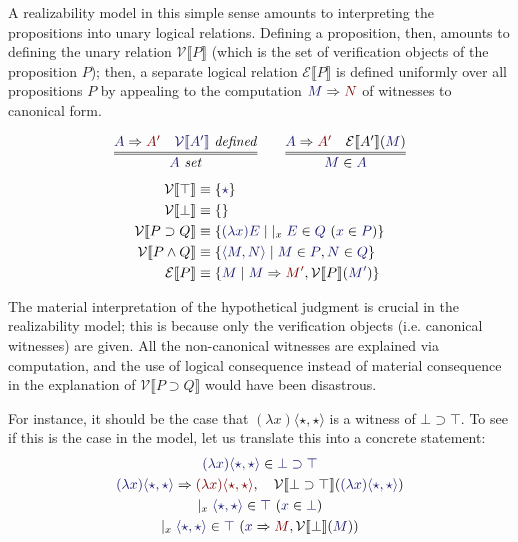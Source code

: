 \documentclass[11pt]{amsart}
\theoremstyle{definition}
\theoremstyle{remark}
\numberwithin{equation}{section}
\def\InputModeColorName{MidnightBlue}
\def\OutputModeColorName{Maroon}
\newcommand\InputMode[1]{{\color{\InputModeColorName}{#1}}}
\newcommand\OutputMode[1]{{\color{\OutputModeColorName}{#1}}}
\newcommand\HypJ[2]{#1\ (#2)}
\newcommand\GenJ[2]{\vert_{#1}\; #2}
\newcommand\IsSet[1]{\InputMode{#1}\ \mathit{set}}
\newcommand\Member[2]{\InputMode{#1}\in \InputMode{#2}}
\newcommand\Eval[2]{\InputMode{#1}\Rightarrow \OutputMode{#2}}
\newcommand\IsDefined[1]{\InputMode{#1}\ \mathit{defined}}
\newcommand\SEM[1]{\llbracket#1 \rrbracket}
\newcommand\VAL[1]{\mathcal{V}\SEM{#1}}
\newcommand\EXP[1]{\mathcal{E}\SEM{#1}}
\newcommand\True{\top}
\newcommand\False{\bot}
\newcommand\Imp[2]{#1\supset #2}
\newcommand\Conj[2]{#1\land #2}
\newcommand\It{\star}
\newcommand\Lam[2]{(\lambda #1) #2}
\newcommand\Pair[2]{\langle #1, #2 \rangle}
\begin{document}
A realizability model in this simple sense amounts to interpreting the
propositions into unary logical relations. Defining a proposition, then, amounts
to defining the unary relation $\VAL{P}$ (which is the set of verification
objects of the proposition $P$); then, a separate logical relation $\EXP{P}$ is
defined uniformly over all propositions $P$ by appealing to the computation
$\Eval{M}{N}$ of witnesses to canonical form.

\begin{gather*}
  \infer={
    \IsSet{A}
  }{
    \Eval{A}{A'} &
    \IsDefined{\VAL{A'}}
  } \qquad
  \infer={
    \Member{M}{A}
  }{
    \Eval{A}{A'} &
    \EXP{A'}(\InputMode{M})
  }
\end{gather*}
\begin{align*}
  \VAL{\True} &\equiv \{\InputMode{\It}\}\\
  \VAL{\False} &\equiv \{\}\\
  \VAL{\Imp{P}{Q}} &\equiv 
    \{ \InputMode{\Lam{x}{E}}
    \mid \GenJ{x}{\HypJ{\Member{E}{Q}}{\Member{x}{P}}}
    \}\\
  \VAL{\Conj{P}{Q}} &\equiv
    \{ \InputMode{\Pair{M}{N}}
    \mid \Member{M}{P}, \Member{N}{Q}
    \}\\
  \EXP{P} &\equiv
    \{ \InputMode{M}
    \mid \Eval{M}{M'}, \VAL{P}(\InputMode{M'})
    \}
\end{align*}

The material interpretation of the hypothetical judgment is crucial in the
realizability model; this is because only the verification objects (i.e.
canonical witnesses) are given. All the non-canonical witnesses are explained
via computation, and the use of logical consequence instead of material
consequence in the explanation of $\VAL{\Imp{P}{Q}}$ would have been disastrous.

For instance, it should be the case that $\Lam{x}{\Pair{\It}{\It}}$ is a witness
of $\Imp{\False}{\True}$. To see if this is the case in the
model, let us translate this into a concrete statement:
\begin{gather}
  \Member{\Lam{x}{\Pair{\It}{\It}}}{\Imp{\False}{\True}}\\
  \Eval{\Lam{x}{\Pair{\It}{\It}}}{\Lam{x}{\Pair{\It}{\It}}}, \quad
    \VAL{\Imp{\False}{\True}}(\InputMode{\Lam{x}{\Pair{\It}{\It}}})\\
  \GenJ{x}{
    \HypJ{\Member{\Pair{\It}{\It}}{\True}}{\Member{x}{\False}}
  }\\
  \GenJ{x}{
    \HypJ{\Member{\Pair{\It}{\It}}{\True}}{\Eval{x}{M}, \VAL{\False}(\InputMode{M})}
  }
\end{gather}
\end{document}
